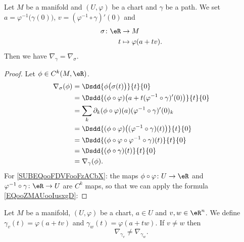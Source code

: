 \begin{lemma}       \label{LEMooXFNQooXwCMNB}
	Let \( M\) be a manifold and \( (U,\varphi)\) be a chart and \( \gamma\) be a path. We set \( a=\varphi^{-1}\big( \gamma(0) \big)\), \(v= (\varphi^{-1}\circ\gamma)'(0)\) and
	\begin{equation}
		\begin{aligned}
			\sigma\colon \eR & \to M                  \\
			t                & \mapsto \varphi(a+tv).
		\end{aligned}
	\end{equation}
	Then we have \( \nabla_{\gamma}=\nabla_{\sigma}\).
\end{lemma}

\begin{proof}
	Let \( \phi\in C^k(M, \eR)\).
	\begin{subequations}
		\begin{align}
			\nabla_{\sigma}(\phi) & =\Dsdd{ \phi\big( \sigma(t) \big) }{t}{0}                                                          \\
			                      & =\Dsdd{ (\phi\circ \varphi)\big( a+t(\varphi^{-1}\circ\gamma)'(0) \big) }{t}{0}                    \\
			                      & =\sum_k\partial_k(\phi\circ\varphi)(a)(\varphi^{-1}\circ\gamma)'(0)_k  \label{SUBEQooFDVFooFzACbX} \\
			                      & =\Dsdd{ (\phi\circ\varphi)\big( (\varphi^{-1}\circ\gamma)(t) \big) }{t}{0}                         \\
			                      & =\Dsdd{ (\phi\circ\varphi\circ\varphi^{-1}\circ\gamma)(t) }{t}{0}                                  \\
			                      & =\Dsdd{ (\phi\circ\gamma)(t) }{t}{0}                                                               \\
			                      & =\nabla_{\gamma}(\phi).
		\end{align}
	\end{subequations}
	For \eqref{SUBEQooFDVFooFzACbX}: the maps \( \phi\circ\varphi\colon U\to \eR\) and \( \varphi^{-1}\circ\gamma\colon \eR\to U\) are \( C^k\) maps, so that we can apply the formula \eqref{EQooZMAUooIusxgD}:
\end{proof}

\begin{lemma}       \label{LEMooGPCBooXMTddG}
	Let \( M\) be a manifold, \( (U,\varphi)\) be a chart, \( a\in U\) and \( v,w\in \eR^n\). We define \( \gamma_v(t)=\varphi(a+tv)\) and \( \gamma_w(t)=\varphi(a+tw)\). If \( v\neq w\) then
	\begin{equation}
		\nabla_{\gamma_v}\neq \nabla_{\gamma_w}.
	\end{equation}
\end{lemma}

